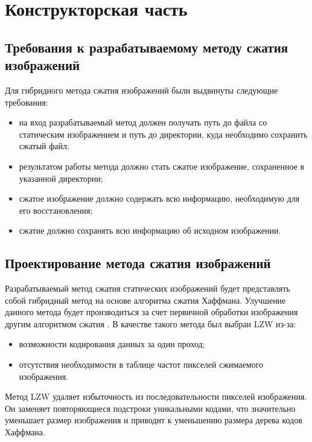 \chapter{Конструкторская часть}

\section{Требования к разрабатываемому методу \mbox{сжатия} изображений}

Для гибридного метода сжатия изображений были выдвинуты следующие требования:
\begin{itemize}
    \item на вход разрабатываемый метод должен получать путь до файла со статическим изображением и путь до директории, куда необходимо сохранить сжатый файл;
    \item результатом работы метода должно стать сжатое изображение, сохраненное в указанной директории;
    \item сжатое изображение должно содержать всю информацию, необходимую для его восстановления;
    \item сжатие должно сохранять всю информацию об исходном изображении.
\end{itemize}

\section{Проектирование метода сжатия изображений}

Разрабатываемый метод сжатия статических изображений будет представлять собой гибридный метод на основе алгоритма сжатия Хаффмана. Улучшение данного метода будет производиться за счет первичной обработки изображения другим алгоритмом сжатия \cite{my-article}. В качестве такого метода был выбран LZW из-за:
\begin{itemize}
    \item возможности кодирования данных за один проход;
    \item отсутствия необходимости в таблице частот пикселей сжимаемого изображения.
\end{itemize}

Метод LZW удаляет избыточность из последовательности пикселей изображения. Он заменяет повторяющиеся подстроки уникальными кодами, что значительно уменьшает размер изображения и приводит к уменьшению размера дерева кодов Хаффмана. 

